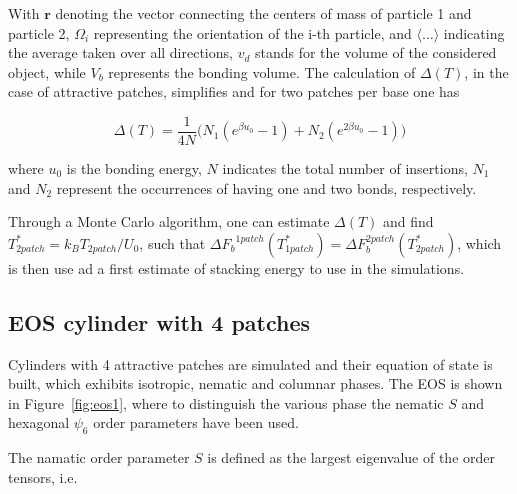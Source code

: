 \documentclass[aip,jcp, amsmath, amssymb, reprint]{revtex4-1}
\begin{document}
With $\textbf{r}$ denoting the vector connecting the centers of mass of particle 1 and particle 2, $\Omega_i$
representing the orientation of the i-th particle, and $\langle\ldots\rangle$ indicating the average taken over all
directions, $v_d$ stands for the volume of the considered object, while $V_b$ represents the bonding volume. The
calculation of $\Delta (T)$, in the case of attractive patches, simplifies and for two patches per base one has 

\begin{equation}
\label{deltat2}
	\Delta(T)=\frac{1}{4N}\big( N_1(e^{\beta u_0}-1)+N_2(e^{2\beta u_0}-1)\big)
\end{equation}

where $u_0$ is the bonding energy, $N$ indicates the total number of insertions, $N_1$ and $N_2$ represent the occurrences of having one and two
bonds, respectively. 

Through a Monte Carlo algorithm, one can estimate $\Delta(T)$
and find $T^*_{2 patch}=k_B T_{2 patch}/U_0$, such that ${\Delta F_b}^{1 patch}(T^*_{1 patch})=\Delta F_b^{2 patch}(T^*_{2 patch})$, 
which is then use ad a first estimate of stacking energy to use in the simulations.

\subsection{EOS cylinder with 4 patches}
Cylinders with 4 attractive patches are simulated and their equation of state is built, which 
exhibits isotropic, nematic and columnar phases.
The EOS is shown in Figure~\ref{fig:eos1}, where to distinguish the various phase the nematic $S$ and hexagonal $\psi_6$ order parameters have been used.

The namatic order parameter $S$ is defined as the largest eigenvalue of the order tensors, i.e.
\end{document}

